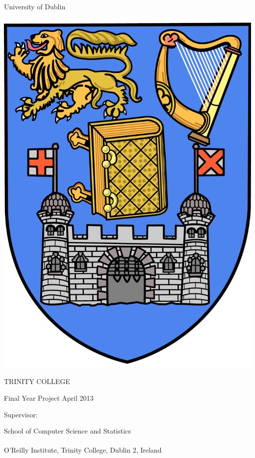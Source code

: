 \thispagestyle{empty}
\begin{center}
{\sffamily
{\Large University of Dublin}

\vspace{10pt}

\includegraphics[scale=0.12]{tcd/trinitycollege.pdf}

\vspace{10pt}

{\Huge TRINITY COLLEGE}

\vspace{80pt}

\textbf{ \Large \emph \projecttitle}

\vspace{30pt}

\authorname

\degreetitle

Final Year Project April 2013

Supervisor: \supervisorname

\vspace{130pt}

\large{School of Computer Science and Statistics
\\$ $\\
O'Reilly Institute, Trinity College, Dublin 2, Ireland}
\linespread{1}
}
\end{center}

